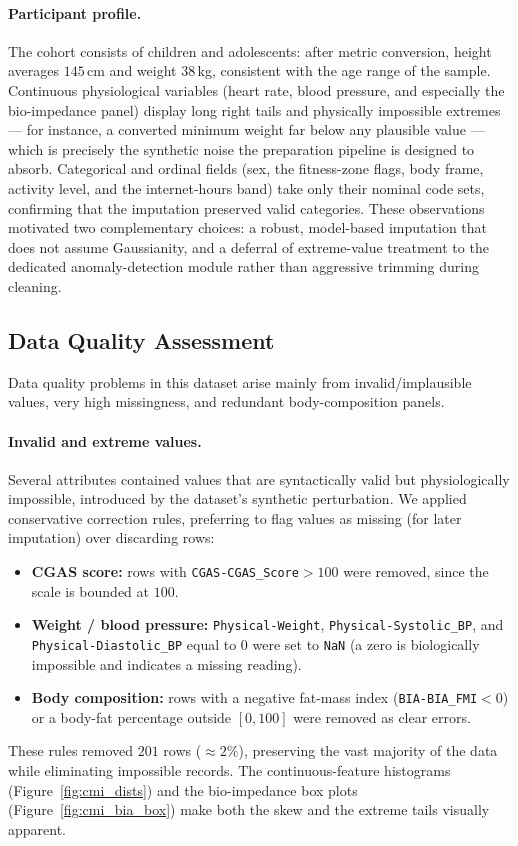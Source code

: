 \paragraph{Participant profile.} The cohort consists of children and adolescents: after metric conversion, height averages $145$\,cm and weight $38$\,kg, consistent with the age range of the sample. Continuous physiological variables (heart rate, blood pressure, and especially the bio-impedance panel) display long right tails and physically impossible extremes --- for instance, a converted minimum weight far below any plausible value --- which is precisely the synthetic noise the preparation pipeline is designed to absorb. Categorical and ordinal fields (sex, the fitness-zone flags, body frame, activity level, and the internet-hours band) take only their nominal code sets, confirming that the imputation preserved valid categories. These observations motivated two complementary choices: a robust, model-based imputation that does not assume Gaussianity, and a deferral of extreme-value treatment to the dedicated anomaly-detection module rather than aggressive trimming during cleaning.

\subsection{Data Quality Assessment}
Data quality problems in this dataset arise mainly from invalid/implausible values, very high missingness, and redundant body-composition panels.

\paragraph{Invalid and extreme values.} Several attributes contained values that are syntactically valid but physiologically impossible, introduced by the dataset's synthetic perturbation. We applied conservative correction rules, preferring to flag values as missing (for later imputation) over discarding rows:
\begin{itemize}
    \item \textbf{CGAS score:} rows with \texttt{CGAS-CGAS\_Score}$>100$ were removed, since the scale is bounded at $100$.
    \item \textbf{Weight / blood pressure:} \texttt{Physical-Weight}, \texttt{Physical-Systolic\_BP}, and \texttt{Physical-Diastolic\_BP} equal to $0$ were set to \texttt{NaN} (a zero is biologically impossible and indicates a missing reading).
    \item \textbf{Body composition:} rows with a negative fat-mass index (\texttt{BIA-BIA\_FMI}$<0$) or a body-fat percentage outside $[0,100]$ were removed as clear errors.
\end{itemize}
These rules removed $201$ rows ($\approx 2\%$), preserving the vast majority of the data while eliminating impossible records. The continuous-feature histograms (Figure~\ref{fig:cmi_dists}) and the bio-impedance box plots (Figure~\ref{fig:cmi_bia_box}) make both the skew and the extreme tails visually apparent.\\

